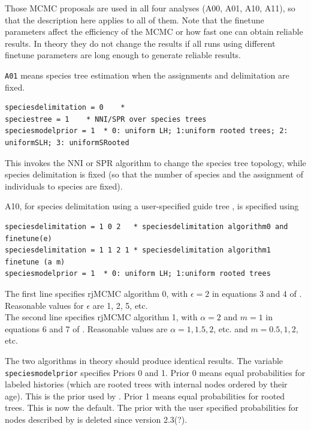 \documentclass[a4paper]{book}
\numberwithin{equation}{section} \renewcommand{\baselinestretch}{0.55}
\begin{document}
Those MCMC proposals are used in all four analyses (A00, A01, A10,
A11), so that the description here applies to all of them.  Note that
the finetune parameters affect the efficiency of the MCMC or how fast
one can obtain reliable results.  In theory they do not change the
results if all runs using different finetune parameters are long
enough to generate reliable results.





\newpage

\texttt{A01} means species tree estimation when the assignments and
delimitation are fixed.
\begin{verbatim}
speciesdelimitation = 0    *
speciestree = 1    * NNI/SPR over species trees
speciesmodelprior = 1  * 0: uniform LH; 1:uniform rooted trees; 2: uniformSLH; 3: uniformSRooted
\end{verbatim}

This invokes the NNI or SPR algorithm to change the species tree
topology, while species delimitation is fixed (so that the number of
species and the assignment of individuals to species are fixed).

A10, for species delimitation using a user-specified guide tree
\citep{Yang2010, Rannala2013}, is specified using

\begin{verbatim}
speciesdelimitation = 1 0 2   * speciesdelimitation algorithm0 and finetune(e)
speciesdelimitation = 1 1 2 1 * speciesdelimitation algorithm1 finetune (a m)
speciesmodelprior = 1  * 0: uniform LH; 1:uniform rooted trees
\end{verbatim}

The first line specifies rjMCMC algorithm 0, with $\epsilon = 2$ in
equations 3 and 4 of \cite{Yang2010}.  Reasonable values for
$\epsilon$ are 1, 2, 5, etc. \\ The second line specifies rjMCMC
algorithm 1, with $ \alpha = 2$ and $m = 1$ in equations 6 and 7 of
\cite{Yang2010}. Reasonable values are $\alpha = 1, 1.5, 2$, etc. and
$m = 0.5, 1, 2$, etc.

The two algorithms in theory should produce identical results.  The
variable \texttt{speciesmodelprior} specifies Priors 0 and 1.  Prior 0
means equal probabilities for labeled histories (which are rooted
trees with internal nodes ordered by their age).  This is the prior
used by \cite[][eq.~2]{Yang2010}.  Prior 1 means equal probabilities
for rooted trees.  This is now the default.  The prior with the user
specified probabilities for nodes described by \cite{Rannala2013} is
deleted since version 2.3(?).
\end{document}
